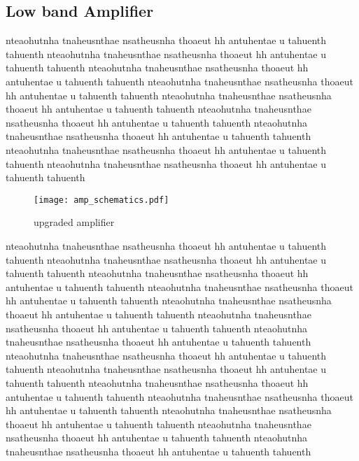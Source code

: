 \subsection{Low band Amplifier}
%  
nteaohutnha tnaheusnthae nsatheusnha thoaeut hh antuhentae u tahuenth tahuenth
nteaohutnha tnaheusnthae nsatheusnha thoaeut hh antuhentae u tahuenth tahuenth
nteaohutnha tnaheusnthae nsatheusnha thoaeut hh antuhentae u tahuenth tahuenth
nteaohutnha tnaheusnthae nsatheusnha thoaeut hh antuhentae u tahuenth tahuenth
nteaohutnha tnaheusnthae nsatheusnha thoaeut hh antuhentae u tahuenth tahuenth
nteaohutnha tnaheusnthae nsatheusnha thoaeut hh antuhentae u tahuenth tahuenth
nteaohutnha tnaheusnthae nsatheusnha thoaeut hh antuhentae u tahuenth tahuenth
nteaohutnha tnaheusnthae nsatheusnha thoaeut hh antuhentae u tahuenth tahuenth
nteaohutnha tnaheusnthae nsatheusnha thoaeut hh antuhentae u tahuenth tahuenth
\begin{figure}[!tbh]
    \centering
    \texttt{[image: amp\_schematics.pdf]}
    \caption{upgraded amplifier}
    \label{fig:amp_schematics}
\end{figure}
nteaohutnha tnaheusnthae nsatheusnha thoaeut hh antuhentae u tahuenth tahuenth
nteaohutnha tnaheusnthae nsatheusnha thoaeut hh antuhentae u tahuenth tahuenth
nteaohutnha tnaheusnthae nsatheusnha thoaeut hh antuhentae u tahuenth tahuenth
nteaohutnha tnaheusnthae nsatheusnha thoaeut hh antuhentae u tahuenth tahuenth
nteaohutnha tnaheusnthae nsatheusnha thoaeut hh antuhentae u tahuenth tahuenth
nteaohutnha tnaheusnthae nsatheusnha thoaeut hh antuhentae u tahuenth tahuenth
nteaohutnha tnaheusnthae nsatheusnha thoaeut hh antuhentae u tahuenth tahuenth
nteaohutnha tnaheusnthae nsatheusnha thoaeut hh antuhentae u tahuenth tahuenth
nteaohutnha tnaheusnthae nsatheusnha thoaeut hh antuhentae u tahuenth tahuenth
nteaohutnha tnaheusnthae nsatheusnha thoaeut hh antuhentae u tahuenth tahuenth
nteaohutnha tnaheusnthae nsatheusnha thoaeut hh antuhentae u tahuenth tahuenth
nteaohutnha tnaheusnthae nsatheusnha thoaeut hh antuhentae u tahuenth tahuenth
nteaohutnha tnaheusnthae nsatheusnha thoaeut hh antuhentae u tahuenth tahuenth
nteaohutnha tnaheusnthae nsatheusnha thoaeut hh antuhentae u tahuenth tahuenth

